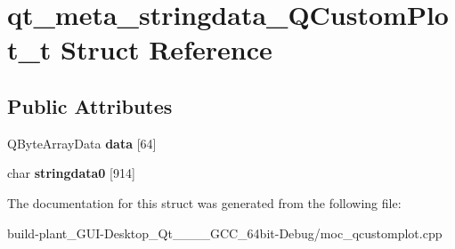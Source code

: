 \hypertarget{structqt__meta__stringdata__QCustomPlot__t}{}\section{qt\+\_\+meta\+\_\+stringdata\+\_\+\+Q\+Custom\+Plot\+\_\+t Struct Reference}
\label{structqt__meta__stringdata__QCustomPlot__t}
\subsection*{Public Attributes}
\begin{DoxyCompactItemize}
\item 
\mbox{\label{structqt__meta__stringdata__QCustomPlot__t_a8977178dafbbe5777e63d644f3bf262a}} 
Q\+Byte\+Array\+Data {\bfseries data} \mbox{[}64\mbox{]}
\item 
\mbox{\label{structqt__meta__stringdata__QCustomPlot__t_ad63fb62139acbe99179838dc5bd42bbb}} 
char {\bfseries stringdata0} \mbox{[}914\mbox{]}
\end{DoxyCompactItemize}


The documentation for this struct was generated from the following file\+:\begin{DoxyCompactItemize}
\item 
build-\/plant\+\_\+\+G\+U\+I-\/\+Desktop\+\_\+\+Qt\+\_\+\_\+\_\+\_\+\+G\+C\+C\+\_\+64bit-\/\+Debug/moc\+\_\+qcustomplot.\+cpp\end{DoxyCompactItemize}
